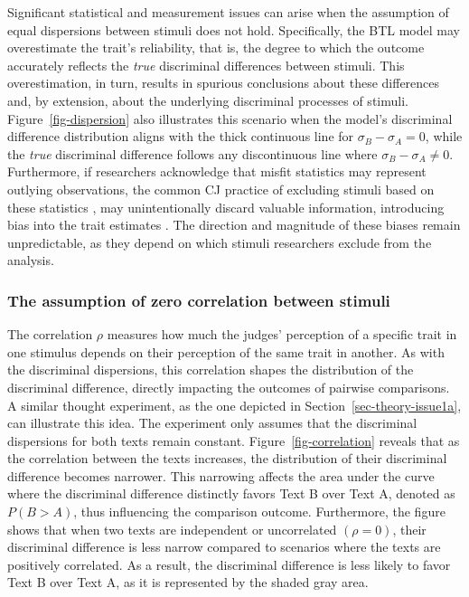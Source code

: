 \documentclass[
  authoryear,
  review,
  1p]{elsarticle}
\begin{document}
Significant statistical and measurement issues can arise when the
assumption of equal dispersions between stimuli does not hold.
Specifically, the BTL model may overestimate the trait's reliability,
that is, the degree to which the outcome accurately reflects the
\emph{true} discriminal differences between stimuli. This
overestimation, in turn, results in spurious conclusions about these
differences \citep[pp.~370]{McElreath_2020} and, by extension, about the
underlying discriminal processes of stimuli. Figure~\ref{fig-dispersion}
also illustrates this scenario when the model's discriminal difference
distribution aligns with the thick continuous line for
\(\sigma_{B}-\sigma_{A}=0\), while the \emph{true} discriminal
difference follows any discontinuous line where
\(\sigma_{B}-\sigma_{A} \neq 0\). Furthermore, if researchers
acknowledge that misfit statistics may represent outlying observations,
the common CJ practice of excluding stimuli based on these statistics
\citep{Pollitt_2012a, Pollitt_2012b, vanDaal_et_al_2016, Goossens_et_al_2018},
may unintentionally discard valuable information, introducing bias into
the trait estimates \citep[chap.~12]{Zimmerman_1994, McElreath_2020}.
The direction and magnitude of these biases remain unpredictable, as
they depend on which stimuli researchers exclude from the analysis.

\subsubsection{The assumption of zero correlation between
stimuli}\label{sec-theory-issue1b}

The correlation \(\rho\) measures how much the judges' perception of a
specific trait in one stimulus depends on their perception of the same
trait in another. As with the discriminal dispersions, this correlation
shapes the distribution of the discriminal difference, directly
impacting the outcomes of pairwise comparisons. A similar thought
experiment, as the one depicted in Section~\ref{sec-theory-issue1a}, can
illustrate this idea. The experiment only assumes that the discriminal
dispersions for both texts remain constant. Figure~\ref{fig-correlation}
reveals that as the correlation between the texts increases, the
distribution of their discriminal difference becomes narrower. This
narrowing affects the area under the curve where the discriminal
difference distinctly favors Text B over Text A, denoted as
\(P(B > A)\), thus influencing the comparison outcome. Furthermore, the
figure shows that when two texts are independent or uncorrelated
\((\rho=0)\), their discriminal difference is less narrow compared to
scenarios where the texts are positively correlated. As a result, the
discriminal difference is less likely to favor Text B over Text A, as it
is represented by the shaded gray area.
\end{document}
